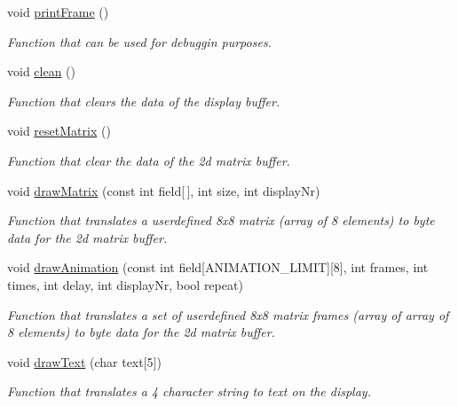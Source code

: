 \begin{DoxyCompactItemize}
void \hyperlink{classdisplay_a7edc22f6e40da7e6693adff3d3529ad5}{print\+Frame} ()
\begin{DoxyCompactList}\small\item\em Function that can be used for debuggin purposes. \end{DoxyCompactList}\item 
void \hyperlink{classdisplay_aaf0e302754aace767ead8e68e84c783d}{clean} ()
\begin{DoxyCompactList}\small\item\em Function that clears the data of the display buffer. \end{DoxyCompactList}\item 
void \hyperlink{classdisplay_a48631fda3500f5550203ddd15e0d539b}{reset\+Matrix} ()
\begin{DoxyCompactList}\small\item\em Function that clear the data of the 2d matrix buffer. \end{DoxyCompactList}\item 
void \hyperlink{classdisplay_a9f061002061eaea0f092f782c7f23d24}{draw\+Matrix} (const int field\mbox{[}$\,$\mbox{]}, int size, int display\+Nr)
\begin{DoxyCompactList}\small\item\em Function that translates a userdefined 8x8 matrix (array of 8 elements) to byte data for the 2d matrix buffer. \end{DoxyCompactList}\item 
void \hyperlink{classdisplay_af50dd224f30fb8aaaec36b0be1d260c8}{draw\+Animation} (const int field\mbox{[}A\+N\+I\+M\+A\+T\+I\+O\+N\+\_\+\+L\+I\+M\+IT\mbox{]}\mbox{[}8\mbox{]}, int frames, int times, int delay, int display\+Nr, bool repeat)
\begin{DoxyCompactList}\small\item\em Function that translates a set of userdefined 8x8 matrix frames (array of array of 8 elements) to byte data for the 2d matrix buffer. \end{DoxyCompactList}\item 
void \hyperlink{classdisplay_a650113fb337e86cf356f412e16973b04}{draw\+Text} (char text\mbox{[}5\mbox{]})
\begin{DoxyCompactList}\small\item\em Function that translates a 4 character string to text on the display. \end{DoxyCompactList}\end{DoxyCompactItemize}
